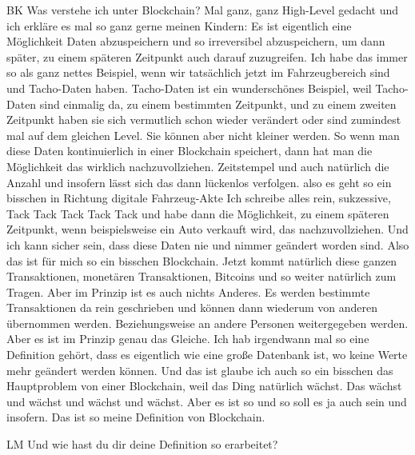 \begin{xlist}
    \item[BK] Was verstehe ich unter Blockchain? Mal ganz, ganz High-Level gedacht und ich erkläre es mal so ganz gerne meinen Kindern: Es ist eigentlich eine Möglichkeit Daten abzuspeichern und so irreversibel abzuspeichern, um dann später, zu einem späteren Zeitpunkt auch darauf zuzugreifen. Ich habe das immer so als ganz nettes Beispiel, wenn wir tatsächlich jetzt im Fahrzeugbereich sind und Tacho-Daten haben. Tacho-Daten ist ein wunderschönes Beispiel, weil Tacho-Daten sind einmalig da, zu einem bestimmten Zeitpunkt, und zu einem zweiten Zeitpunkt haben sie sich vermutlich schon wieder verändert oder sind zumindest mal auf dem gleichen Level. Sie können aber nicht kleiner werden. So wenn man diese Daten kontinuierlich in einer Blockchain speichert, dann hat man die Möglichkeit das wirklich nachzuvollziehen. Zeitstempel und auch natürlich die Anzahl und insofern lässt sich das dann lückenlos verfolgen. also es geht so ein bisschen in Richtung digitale Fahrzeug-Akte Ich schreibe alles rein, sukzessive, Tack Tack Tack Tack Tack und habe dann die Möglichkeit, zu einem späteren Zeitpunkt, wenn beispielsweise ein Auto verkauft wird, das nachzuvollziehen. Und ich kann sicher sein, dass diese Daten nie und nimmer geändert worden sind. Also das ist für mich so ein bisschen Blockchain. Jetzt kommt natürlich diese ganzen Transaktionen, monetären Transaktionen, Bitcoins und so weiter natürlich zum Tragen. Aber im Prinzip ist es auch nichts Anderes. Es werden bestimmte Transaktionen da rein geschrieben und können dann wiederum von anderen übernommen werden. Beziehungsweise an andere Personen weitergegeben werden. Aber es ist im Prinzip genau das Gleiche. Ich hab irgendwann mal so eine Definition gehört, dass es eigentlich wie eine große Datenbank ist, wo keine Werte mehr geändert werden können. Und das ist glaube ich auch so ein bisschen das Hauptproblem von einer Blockchain, weil das Ding natürlich wächst. Das wächst und wächst und wächst und wächst. Aber es ist so und so soll es ja auch sein und insofern. Das ist so meine Definition von Blockchain.
    \item[LM] Und wie hast du dir deine Definition so erarbeitet?

\end{xlist}
